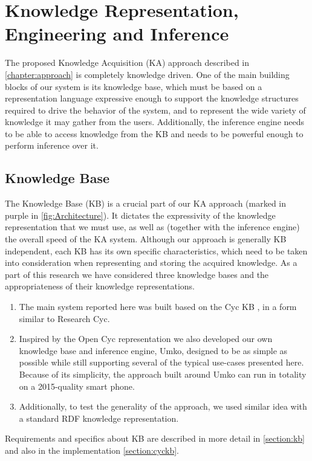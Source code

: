 \section{Knowledge Representation, Engineering and Inference}
\label{section:bg:knowledge}
The proposed Knowledge Acquisition (KA) approach described in 
\autoref{chapter:approach} is completely knowledge driven. One of the main 
building blocks of our system is its knowledge base, which must be based on a 
representation language expressive enough to support the knowledge structures 
required to drive the behavior of the system, and to represent the wide variety 
of knowledge it may gather from the users. Additionally, the inference engine 
needs to be able to access knowledge from the KB and needs to be powerful enough 
to perform inference over it.

\subsection{Knowledge Base}
\label{section:bg:kb}
The Knowledge Base (KB) is a crucial part of our KA approach 
(marked in purple in \autoref{fig:Architecture}). It dictates the expressivity 
of the knowledge representation that we must use, as well as 
(together with the inference engine) the overall speed of the KA system. 
Although our approach is generally KB independent, each KB has its own 
specific characteristics, which need to be taken into consideration when 
representing and storing the acquired knowledge. As a part of this research we 
have considered three knowledge bases and the appropriateness of their 
knowledge representations.
\begin{enumerate}
\item The main system reported here was built based on the Cyc KB
\parencite{Lenat1995}, in a form similar to Research Cyc. 
\item Inspired by the Open Cyc representation we also developed our own 
knowledge base and inference engine, Umko, designed to be as simple as possible
while still supporting several of the typical use-cases presented here. 
Because of its simplicity, the approach built around Umko can run in totality 
on a 2015-quality smart phone.
\item Additionally, to test the generality of the approach, we used similar 
idea with a standard RDF knowledge representation\parencite{Bradesko2012}.
\end{enumerate}

Requirements and specifics about KB are described in more detail in 
\autoref{section:kb} and also in the implementation \autoref{section:cyckb}.

